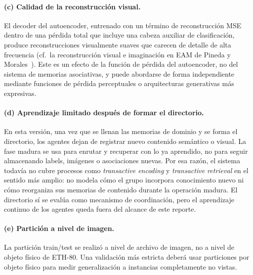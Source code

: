 \paragraph{(c) Calidad de la reconstrucción visual.}
El decoder del autoencoder, entrenado con un término de reconstrucción MSE dentro de una pérdida total que incluye una cabeza auxiliar de clasificación, produce reconstrucciones visualmente suaves que carecen de detalle de alta frecuencia (cf.\ la reconstrucción visual e imaginación en EAM de Pineda y Morales~\cite{pineda2023imagery}).
Este es un efecto de la función de pérdida del autoencoder, no del sistema de memorias asociativas, y puede abordarse de forma independiente mediante funciones de pérdida perceptuales o arquitecturas generativas más expresivas.

\paragraph{(d) Aprendizaje limitado después de formar el directorio.}
En esta versión, una vez que se llenan las memorias de dominio y se forma el directorio,
los agentes dejan de registrar nuevo contenido semántico o visual.
La fase madura se usa para enrutar y recuperar con lo ya aprendido, no para seguir
almacenando labels, imágenes o asociaciones nuevas.
Por esa razón, el sistema todavía no cubre procesos como \emph{transactive encoding} y
\emph{transactive retrieval} en el sentido más amplio: no modela cómo el grupo incorpora
conocimiento nuevo ni cómo reorganiza sus memorias de contenido durante la operación
madura.
El directorio sí se evalúa como mecanismo de coordinación, pero el aprendizaje continuo
de los agentes queda fuera del alcance de este reporte.

\paragraph{(e) Partición a nivel de imagen.}
La partición train/test se realizó a nivel de archivo de imagen, no a nivel de objeto físico de ETH-80.
Una validación más estricta deberá usar particiones por objeto físico para medir generalización a instancias completamente no vistas.

